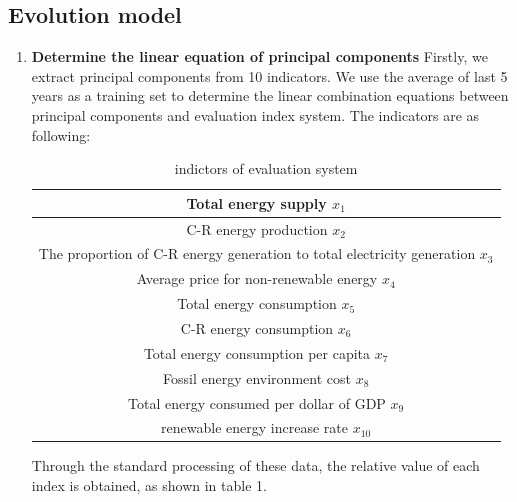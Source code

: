 \documentclass{mcmthesis}
\begin{document}
\begin{enumerate}
        \subsection{Evolution model}
        \begin{enumerate}
          \item \textbf{Determine the linear equation of principal components}
        Firstly, we extract principal components from 10 indicators. We use the average of last 5 years as a training set to determine the linear combination equations between principal components and evaluation index system.
      The indicators are as following:
      \begin{table}
      \begin{tabular}{|c|}
      \hline
      {Total energy supply $x_1$}\\
      \hline
      {C-R energy production $x_2$}\\
      \hline
      {The proportion of C-R energy generation to total electricity generation $x_3$}\\
      \hline
      { Average price for non-renewable energy $x_4$}\\
      \hline
      { Total energy consumption $x_5$}\\
      \hline
      { C-R energy consumption $x_6$}\\
      \hline
      { Total energy consumption per capita $x_7$}\\
      \hline
      {  Fossil energy environment cost $x_8$}\\
      \hline
      { Total energy consumed per dollar of GDP $x_9$}\\
      \hline
      {renewable energy increase rate $x_{10}$}\\
      \hline
      \end{tabular}
      \caption{indictors of evaluation system}

      \end{table}



      Through the standard processing of these data, the relative value of each index is obtained, as shown in table 1.


\end{enumerate}
\end{enumerate}
\end{document}
